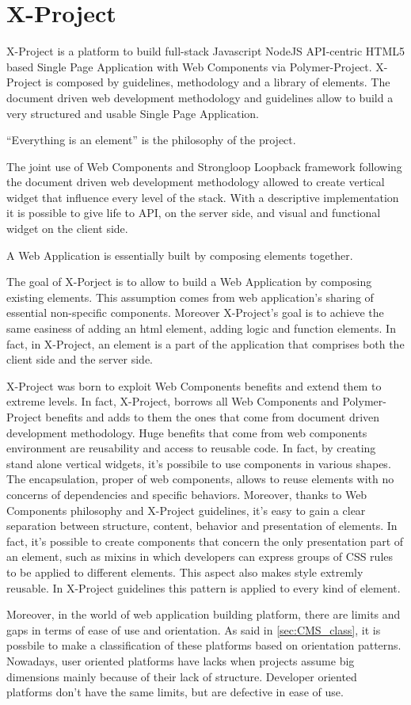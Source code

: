 \section{X-Project}
\label{sec:XPR_xpr}

X-Project is a platform to build full-stack Javascript NodeJS API-centric HTML5 based Single Page Application with Web Components via Polymer-Project.
X-Project is composed by guidelines, methodology and a library of elements.
The document driven web development methodology and guidelines allow to build a very structured and usable Single Page Application.

``Everything is an element'' is the philosophy of the project.

The joint use of Web Components and Strongloop Loopback framework following the document driven web development methodology allowed to create vertical widget that influence every level of the stack. With a descriptive implementation it is possible to give life to API, on the server side, and visual and functional widget on the client side.

A Web Application is essentially built by composing elements together.

The goal of X-Porject is to allow to build a Web Application by composing existing elements. This assumption comes from web application's sharing of essential non-specific components.
Moreover X-Project's goal is to achieve the same easiness of adding an html element, adding logic and function elements.
In fact, in X-Project, an element is a part of the application that comprises both the client side and the server side.

X-Project was born to exploit Web Components benefits and extend them to extreme levels. In fact, X-Project, borrows all Web Components and Polymer-Project benefits and adds to them the ones that come from document driven development methodology.
Huge benefits that come from web components environment are reusability and access to reusable code. In fact, by creating stand alone vertical widgets, it's possibile to use components in various shapes.
The encapsulation, proper of web components, allows to reuse elements with no concerns of dependencies and specific behaviors.
Moreover, thanks to Web Components philosophy and X-Project guidelines, it's easy to gain a clear separation between structure, content, behavior and presentation of elements. 
In fact, it's possible to create components that concern the only presentation part of an element, such as mixins in which developers can express groups of CSS rules to be applied to different elements. This aspect also makes style extremly reusable.
In X-Project guidelines this pattern is applied to every kind of element.

Moreover, in the world of web application building platform, there are limits and gaps in terms of ease of use and orientation. As said in \ref{sec:CMS_class}, it is possbile to make a classification of these platforms based on orientation patterns. Nowadays, user oriented platforms have lacks when projects assume big dimensions mainly because of their lack of structure. Developer oriented platforms don't have the same limits, but are defective in ease of use. 

